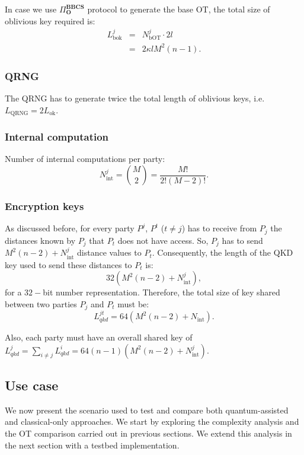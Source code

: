 In case we use $\Pi^{\textbf{BBCS}}_{\textbf{O}}$ protocol to generate the base OT, the total size of oblivious key required is:
\begin{eqnarray*}
L^j_{\text{bok}} &=& N_{\text{bOT}}^j \cdot 2l \\
&=& 2\kappa lM^2(n-1).
\end{eqnarray*}


\subsubsection{QRNG}
The QRNG has to generate twice the total length of oblivious keys, i.e. $L_{\text{QRNG}} = 2L_\text{ok}$.

\subsubsection{Internal computation}
Number of internal computations per party:
$$N_\text{int}^j = \binom{M}{2} = \frac{M!}{2!(M-2)!}.$$

\subsubsection{Encryption keys}
As discussed before, for every party $P^j$, $P^t$ ($t\neq j$) has to receive from $P_j$ the distances known by $P_j$ that $P_t$ does not have access. So, $P_j$ has to send $M^2(n-2) + N_\text{int}^j$ distance values to $P_t$. Consequently, the length of the QKD key used to send these distances to $P_t$ is:
$$32(M^2(n-2) + N^j_\text{int}),$$
for a $32-$bit number representation. Therefore, the total size of key shared between two parties $P_j$ and $P_t$ must be:
$$L^{jt}_{qkd} = 64(M^2(n-2) + N_\text{int}).$$

Also, each party must have an overall shared key of $L^{j}_{qkd} = \sum_{i\neq j} L^{i}_{qkd} = 64(n-1)(M^2(n-2) + N^j_\text{int})$.



\subsection{Use case}\label{useCase}

We now present the scenario used to test and compare both quantum-assisted and classical-only approaches. We start by exploring the complexity analysis and the OT comparison carried out in previous sections. We extend this analysis in the next section with a testbed implementation. 

